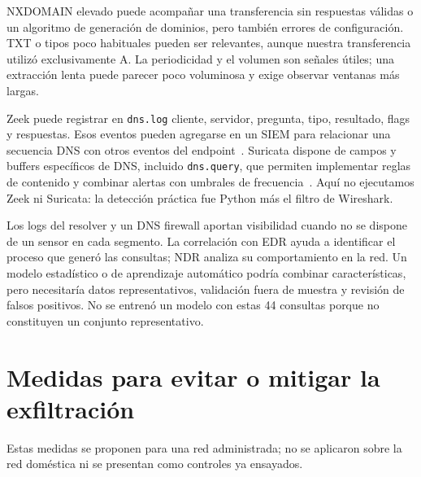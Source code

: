\documentclass[11pt,a4paper]{article}
\begin{document}
NXDOMAIN elevado puede acompañar una transferencia sin respuestas válidas
o un algoritmo de generación de dominios, pero también errores de
configuración. TXT o tipos poco habituales pueden ser relevantes, aunque
nuestra transferencia utilizó exclusivamente A. La periodicidad y el volumen
son señales útiles; una extracción lenta puede parecer poco voluminosa y
exige observar ventanas más largas.

Zeek puede registrar en \nolinkurl{dns.log} cliente, servidor, pregunta, tipo,
resultado, flags y respuestas. Esos eventos pueden agregarse en un SIEM
para relacionar una secuencia DNS con otros eventos del endpoint~\cite{zeek}.
Suricata dispone de campos y buffers específicos de DNS, incluido
\nolinkurl{dns.query}, que permiten implementar reglas de contenido y combinar
alertas con umbrales de frecuencia~\cite{suricata}. Aquí no ejecutamos Zeek
ni Suricata: la detección práctica fue Python más el filtro de Wireshark.

Los logs del resolver y un DNS firewall aportan visibilidad cuando no se
dispone de un sensor en cada segmento. La correlación con EDR ayuda a
identificar el proceso que generó las consultas; NDR analiza su comportamiento
en la red. Un modelo estadístico o de aprendizaje automático podría combinar
características, pero necesitaría datos representativos, validación fuera
de muestra y revisión de falsos positivos. No se entrenó un modelo con estas
44 consultas porque no constituyen un conjunto representativo.
\section{Medidas para evitar o mitigar la exfiltración}

Estas medidas se proponen para una red administrada; no se aplicaron sobre
la red doméstica ni se presentan como controles ya ensayados.
\end{document}
